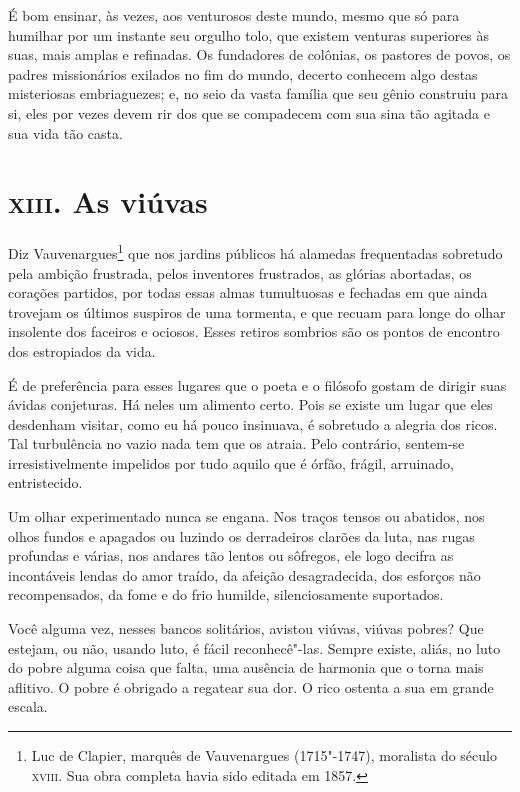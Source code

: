 É bom ensinar, às vezes, aos venturosos deste mundo, mesmo que só para
humilhar por um instante seu orgulho tolo, que existem venturas
superiores às suas, mais amplas e refinadas. Os fundadores de colônias,
os pastores de povos, os padres missionários exilados no fim do mundo,
decerto conhecem algo destas misteriosas embriaguezes; e, no seio da
vasta família que seu gênio construiu para si, eles por vezes devem rir
dos que se compadecem com sua sina tão agitada e sua vida tão
casta.

\chapter{\textsc{xiii.} As viúvas}

Diz Vauvenargues\footnote{
 Luc de Clapier, marquês de Vauvenargues (1715"-1747), moralista do
século \textsc{xviii}. Sua obra completa havia sido editada em 1857.}
 que nos jardins públicos há
alamedas frequentadas sobretudo pela ambição frustrada, pelos
inventores frustrados, as glórias abortadas, os corações partidos,
por todas essas almas tumultuosas e fechadas em que ainda trovejam
os últimos suspiros de uma tormenta, e que recuam para longe do olhar
insolente dos faceiros e ociosos. Esses retiros sombrios são os
pontos de encontro dos estropiados da vida.

É de preferência para esses lugares que o poeta e o filósofo gostam de
dirigir suas ávidas conjeturas. Há neles um alimento certo. Pois se
existe um lugar que eles desdenham visitar, como eu há pouco insinuava,
é sobretudo a alegria dos ricos. Tal turbulência no vazio nada tem que
os atraia. Pelo contrário, sentem-se irresistivelmente impelidos
por tudo aquilo que é órfão, frágil, arruinado, entristecido.

Um olhar experimentado nunca se engana. Nos traços tensos ou
abatidos, nos olhos fundos e apagados ou luzindo os derradeiros clarões
da luta, nas rugas profundas e várias, nos andares tão
lentos ou sôfregos, ele logo decifra as incontáveis lendas do amor
traído, da afeição desagradecida, dos esforços não recompensados, da
fome e do frio humilde, silenciosamente suportados.

Você alguma vez, nesses bancos solitários, avistou viúvas, viúvas
pobres? Que estejam, ou não, usando luto, é fácil reconhecê"-las. Sempre existe, aliás, no luto do pobre alguma coisa que falta, uma ausência de
harmonia que o torna mais aflitivo. O pobre é obrigado a regatear sua dor. O
rico ostenta a sua em grande escala.

